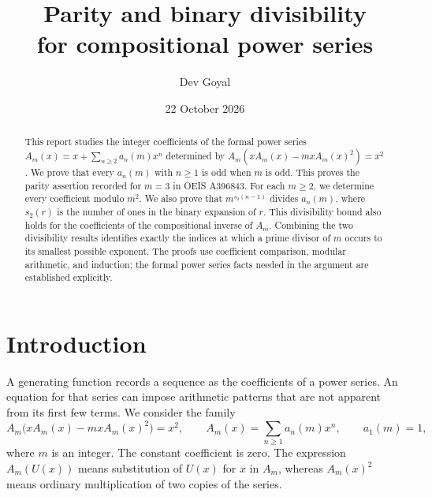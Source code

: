 \documentclass[11pt,a4paper]{article}
\title{Parity and binary divisibility\\for compositional power series}
\author{Dev Goyal}
\date{22 October 2026}
\theoremstyle{remark}
\begin{document}
\maketitle

\begin{center}
\end{center}

\begin{abstract}
This report studies the integer coefficients of the formal power series
$A_m(x)=x+\sum_{n\ge2}a_n(m)x^n$ determined by
$A_m(xA_m(x)-mxA_m(x)^2)=x^2$.
We prove that every $a_n(m)$ with $n\ge1$ is odd when $m$ is odd. This proves the parity
assertion recorded for $m=3$ in OEIS A396843. For each $m\ge2$, we determine
every coefficient modulo $m^2$. We also prove that
$m^{s_2(n-1)}$ divides $a_n(m)$, where $s_2(r)$ is the number of ones in
the binary expansion of $r$. This divisibility bound also holds for the
coefficients of the compositional inverse of $A_m$. Combining the two
divisibility results identifies exactly the indices at which a prime divisor
of $m$ occurs to its smallest possible exponent. The proofs use coefficient
comparison, modular arithmetic, and induction; the formal power series facts
needed in the argument are established explicitly.
\end{abstract}

\section{Introduction}

A generating function records a sequence as the coefficients of a power
series. An equation for that series can impose arithmetic patterns that are
not apparent from its first few terms. We consider the family
\begin{equation}\label{eq:general}
 A_m\bigl(xA_m(x)-mxA_m(x)^2\bigr)=x^2,
 \qquad A_m(x)=\sum_{n\ge1}a_n(m)x^n,
 \qquad a_1(m)=1,
\end{equation}
where $m$ is an integer. The constant coefficient is zero. The expression
$A_m(U(x))$ means substitution of $U(x)$ for $x$ in $A_m$, whereas
$A_m(x)^2$ means ordinary multiplication of two copies of the series.
\end{document}
